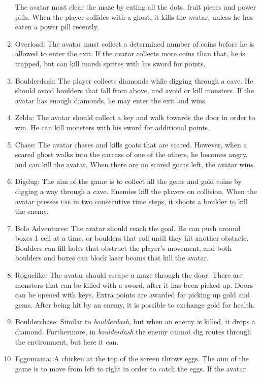\begin{enumerate}
		The avatar must clear the maze by eating all the dots, fruit pieces and
		power pills.  When the player collides with a ghost, it kills the
		avatar, unless he has eaten a power pill recently.
	\item Overload:
		The avatar must collect a determined number of coins before he is
		allowed to enter the exit. If the avatar collects more coins than that,
		he is trapped, but can kill marsh sprites with his sword for points.
	\item Boulderdash:
		The player collects diamonds while digging through a cave. He should
		avoid boulders that fall from above, and avoid or kill monsters. If the
		avatar has enough diamonds, he may enter the exit and wins.
	\item Zelda:
		The avatar should collect a key and walk towards the door in order to
		win. He can kill monsters with his sword for additional points.
	\item Chase:
		The avatar chases and kills goats that are scared. However, when a
		scared ghost walks into the carcass of one of the others, he becomes
		angry, and can kill the avatar. When there are no scared goats left, the
		avatar wins.
	\item Digdug:
		The aim of the game is to collect all the gems and gold coins by digging
		a way through a cave. Enemies kill the players on collision. When the
		avatar presses \textsc{use} in two consecutive time steps, it shoots a boulder to
		kill the enemy.
	\item Bolo Adventures:
		The avatar should reach the goal. He can push around boxes 1 cell at a
		time, or boulders that roll until they hit another obstacle. Boulders
		can fill holes that obstruct the player's movement, and both boulders
		and boxes can block laser beams that kill the avatar.
	\item Roguelike:
		The avatar should escape a maze through the door. There are monsters
		that can be killed with a sword, after it has been picked up. Doors can
		be opened with keys. Extra points are awarded for picking up gold and
		gems. After being hit by an enemy, it is possible to exchange gold for
		health.
	\item Boulderchase:
		Similar to \textit{boulderdash}, but when an enemy is killed, it drops a
		diamond. Furthermore, in \textit{boulderdash} the enemy cannot dig
		routes through the environment, but here it can.
	\item Eggomania:
		A chicken at the top of the screen throws eggs. The aim of the game is
		to move from left to right in order to catch the eggs. If the avatar

\end{enumerate}
